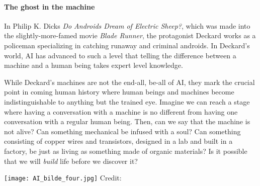 
\paragraph{The ghost in the machine}

In Philip K. Dicks \emph{Do Androids Dream of Electric Sheep?}, which was made into the slightly-more-famed movie \emph{Blade Runner}, the protagonist Deckard works as a policeman specializing in catching runaway and criminal androids. In Deckard's world, AI has advanced to such a level that telling the difference between a machine and a human being takes expert level knowledge.

While Deckard's machines are not the end-all, be-all of AI, they mark the crucial point in coming human history where human beings and machines become indistinguishable to anything but the trained eye.
Imagine we can reach a stage where having a conversation with a machine is no different from having one conversation with a regular human being.
Then, can we say that the machine is not alive?
Can something mechanical be infused with a soul?
Can something consisting of copper wires and transistors, designed in a lab and built in a factory, be just as living as something made of organic materials?
Is it possible that we will \emph{build} life before we discover it?

\begin{center}
	\texttt{[image: AI\_bilde\_four.jpg]}
	\tiny{Credit: }
\end{center}

